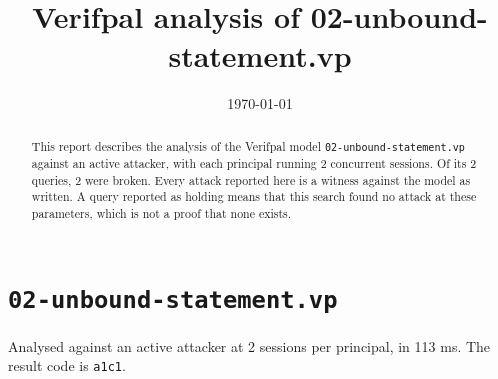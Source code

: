 \documentclass[11pt]{article}
\title{Verifpal analysis of 02-unbound-statement.vp}
\author{}
\date{\today}
\begin{document}
\maketitle

\begin{abstract}
\noindent This report describes the analysis of the Verifpal model \texttt{02-unbound-statement.vp} against an active attacker, with each principal running 2 concurrent sessions. Of its 2 queries, 2 were broken. Every attack reported here is a witness against the model as written. A query reported as holding means that this search found no attack at these parameters, which is not a proof that none exists.
\end{abstract}



\section{\texorpdfstring{\texttt{02-unbound-statement.vp}}{02-unbound-statement.vp}}
\label{sec:02-unbound-statement-vp-0}


\noindent Analysed against an active attacker at 2 sessions per principal, in 113 ms. The result code is \texttt{a1c1}.
\end{document}
